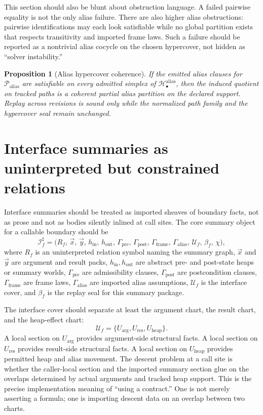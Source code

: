 \documentclass[11pt]{report}
\newtheorem{proposition}[definition]{Proposition}
\begin{document}
This section should also be blunt about obstruction language. A failed pairwise equality is not the only alias failure. There are also higher alias obstructions: pairwise identifications may each look satisfiable while no global partition exists that respects transitivity and imported frame laws. Such a failure should be reported as a nontrivial alias cocycle on the chosen hypercover, not hidden as ``solver instability.''

\begin{proposition}[Alias hypercover coherence]
If the emitted alias clauses for $\mathcal{P}_{\mathrm{alias}}$ are satisfiable on every admitted simplex of $\mathcal{H}^{\mathrm{alias}}_{\bullet}$, then the induced quotient on tracked paths is a coherent partial alias partition on the declared support. Replay across revisions is sound only while the normalized path family and the hypercover seal remain unchanged.
\end{proposition}

\section{Interface summaries as uninterpreted but constrained relations}
Interface summaries should be treated as imported sheaves of boundary facts, not as prose and not as bodies silently inlined at call sites. The core summary object for a callable boundary should be
\[
\mathcal{I}^{\sharp}_{f}
=
\bigl(
R_f,\,
\vec{x},\,
\vec{y},\,
h_{\mathrm{in}},\,
h_{\mathrm{out}},\,
\Gamma_{\mathrm{pre}},\,
\Gamma_{\mathrm{post}},\,
\Gamma_{\mathrm{frame}},\,
\Gamma_{\mathrm{alias}},\,
\mathcal{U}_{f},\,
\beta_f,\,
\chi
\bigr),
\]
where $R_f$ is an uninterpreted relation symbol naming the summary graph, $\vec{x}$ and $\vec{y}$ are argument and result packs, $h_{\mathrm{in}},h_{\mathrm{out}}$ are abstract pre- and post-state heaps or summary worlds, $\Gamma_{\mathrm{pre}}$ are admissibility clauses, $\Gamma_{\mathrm{post}}$ are postcondition clauses, $\Gamma_{\mathrm{frame}}$ are frame laws, $\Gamma_{\mathrm{alias}}$ are imported alias assumptions, $\mathcal{U}_f$ is the interface cover, and $\beta_f$ is the replay seal for this summary package.

The interface cover should separate at least the argument chart, the result chart, and the heap-effect chart:
\[
\mathcal{U}_f
=
\{U_{\mathrm{arg}},U_{\mathrm{res}},U_{\mathrm{heap}}\}.
\]
A local section on $U_{\mathrm{arg}}$ provides argument-side structural facts. A local section on $U_{\mathrm{res}}$ provides result-side structural facts. A local section on $U_{\mathrm{heap}}$ provides permitted heap and alias movement. The descent problem at a call site is whether the caller-local section and the imported summary section glue on the overlaps determined by actual arguments and tracked heap support. This is the precise implementation meaning of ``using a contract.'' One is not merely asserting a formula; one is importing descent data on an overlap between two charts.
\end{document}
